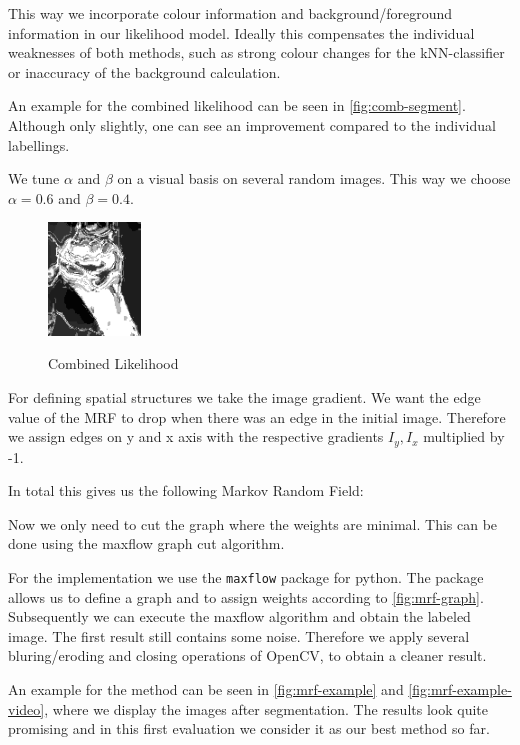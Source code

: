 \documentclass[letterpaper, 10 pt, conference]{ieeeconf}  %
\begin{document}
This way we incorporate colour information and background/foreground information in our likelihood model. Ideally this compensates the individual weaknesses of both methods, such as strong colour changes for the kNN-classifier or inaccuracy of the background calculation.

An example for the combined likelihood can be seen in \autoref{fig:comb-segment}. Although only slightly, one can see an improvement compared to the individual labellings.

We tune $\alpha$ and $\beta$ on a visual basis on several random images. This way we choose $\alpha = 0.6$ and $\beta=0.4$.
\begin{figure}
\centering
	\includegraphics[height=3cm]{comb-segment}
	\label{fig:comb-segment}
	\caption{Combined Likelihood}
\end{figure}

For defining spatial structures we take the image gradient. We want the edge value of the MRF to drop when there was an edge in the initial image. Therefore we assign edges on y and x axis with the respective gradients $I_y, I_x$ multiplied by -1.

In total this gives us the following Markov Random Field:
\begin{center}



\end{center}

Now we only need to cut the graph where the weights are minimal. This can be done using the maxflow graph cut algorithm.

For the implementation we use the \texttt{maxflow} package for python. The package allows us to define a graph and to assign weights according to \autoref{fig:mrf-graph}. Subsequently we can execute the maxflow algorithm and obtain the labeled image. The first result still contains some noise. Therefore we apply several bluring/eroding and closing operations of OpenCV, to obtain a cleaner result.

An example for the method can be seen in \autoref{fig:mrf-example} and \autoref{fig:mrf-example-video}, where we display the images after segmentation. The results look quite promising and in this first evaluation we consider it as our best method so far.
\end{document}
